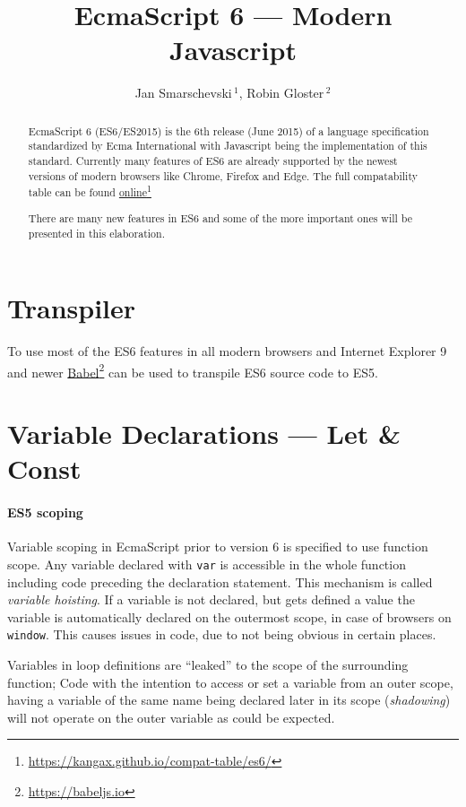 \documentclass{bioinfo}
\newcommand\fnurl[2]{%
  \href{#1}{#2}\footnote{\url{#1}}%
}
\begin{document}
\title[EcmaScript 6]{EcmaScript 6 --- Modern Javascript}
\author[Smarschevski, Gloster]{Jan Smarschevski\,$^{1}$, Robin Gloster\,$^{2}$}
\address{$^{1}$jan.smarschevski@tum.de\\
$^{2}$robin.gloster@tum.de}

\maketitle

\begin{abstract}
EcmaScript 6 (ES6/ES2015) is the 6th release (June 2015) of a language
specification standardized by Ecma International with Javascript being
the implementation of this standard. Currently many features of ES6
are already supported by the newest versions of modern browsers like Chrome,
Firefox and Edge. The full compatability table can be found
\fnurl{https://kangax.github.io/compat-table/es6/}{online}
There are many new features in ES6 and some of the more important ones will
be presented in this elaboration.
\end{abstract}

\section{Transpiler}
To use most of the ES6 features in all modern browsers and Internet Explorer 9
and newer \fnurl{https://babeljs.io}{Babel} can be used to transpile ES6 source
code to ES5.

\section{Variable Declarations --- Let \& Const}
\paragraph{ES5 scoping\textcolon}
Variable scoping in EcmaScript prior to version 6 is specified to use function scope.
Any variable declared with {\tt var} is accessible in the whole function including
code preceding the declaration statement. This mechanism is called {\em variable hoisting}.
If a variable is not declared, but gets defined a value the variable is automatically declared
on the outermost scope, in case of browsers on {\tt window}. This causes issues in code, due
to not being obvious in certain places.

Variables in loop definitions are ``leaked'' to the scope of the surrounding function; Code
with the intention to access or set a variable from an outer scope, having a variable of
the same name being declared later in its scope ({\em shadowing}) will not operate on the
outer variable as could be expected.
\end{document}
